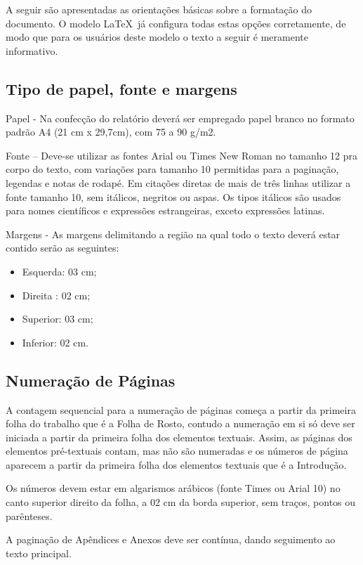 A seguir são apresentadas as orientações básicas sobre a formatação do
documento. O modelo \LaTeX\ já configura todas estas opções corretamente, de modo que para os usuários deste modelo o texto a seguir é meramente
informativo.

\subsection{Tipo de papel, fonte e margens}

Papel - Na confecção do relatório deverá ser empregado papel branco no 
formato padrão A4 (21 cm x 29,7cm), com 75 a 90 g/m2.

Fonte – Deve-se utilizar as fontes Arial ou Times New Roman no tamanho 12  pra corpo do texto, com variações para tamanho 10 permitidas para a paginação, legendas e notas de rodapé. Em citações diretas de mais de três 
linhas utilizar a fonte tamanho 10, sem itálicos, negritos ou aspas. Os 
tipos itálicos são usados para nomes científicos e expressões estrangeiras, 
exceto expressões latinas.

Margens - As margens delimitando a região na qual todo o texto deverá estar 
contido serão as seguintes: 

\begin{itemize}
	\item Esquerda: 03 cm;
	\item Direita	: 02 cm;
	\item Superior: 03 cm;
	\item Inferior: 02 cm. 
\end{itemize}

\subsection{Numeração de Páginas}

A contagem sequencial para a numeração de páginas começa a partir da 
primeira folha do trabalho que é a Folha de Rosto, contudo a numeração em  si só deve ser iniciada a partir da primeira folha dos elementos textuais. 
Assim, as páginas dos elementos pré-textuais contam, mas não são numeradas e os números de página aparecem a partir da primeira folha dos elementos textuais que é a Introdução. 

Os números devem estar em algarismos arábicos (fonte Times ou Arial 10) no canto superior direito da folha, a 02 cm da borda superior, sem traços, pontos ou parênteses. 

A paginação de Apêndices e Anexos deve ser contínua, dando seguimento ao texto principal.

